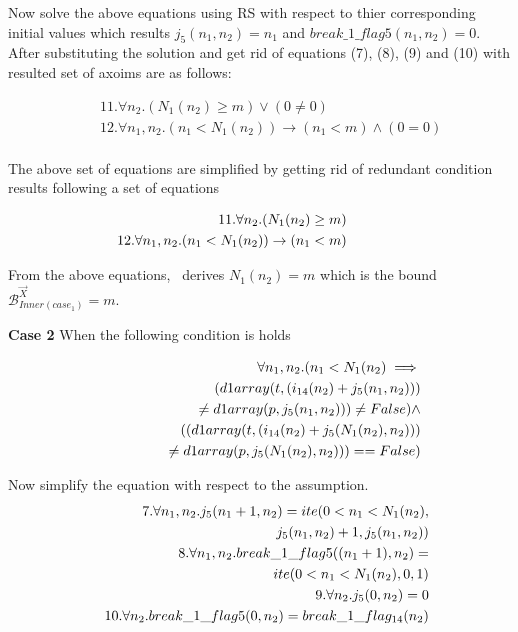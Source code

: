 Now solve the above equations using RS  with respect to thier corresponding initial values which results $j_5(n_1,n_2)=n_1$ and $break\_1\_flag5(n_1,n_2)=0$. After substituting the solution and get rid of equations (7), (8), (9) and (10) with resulted set of axoims are as follows:

\begin{eqnarray*}
	&&11.\forall n_2.(N_1(n_2)\geq m) \lor (0\not=0) \\
	&&12.\forall n_1,n_2.(n_1<N_1(n_2)) \rightarrow (n_1<m) \land (0=0)\\
\end{eqnarray*}

The above set of equations are simplified by getting rid of redundant condition results following a set of equations

\begin{eqnarray*}
	&&\hspace*{-5em}11.\forall n_2.(N_1(n_2)\geq m)  \\
	&&\hspace*{-5em}12.\forall n_1,n_2.(n_1<N_1(n_2)) \rightarrow (n_1<m)\\
\end{eqnarray*}

From the above equations, \SystemName\ derives $N_1(n_2)=m$ which is the bound $\mathcal{B}^{\vec{X}}_{Inner(case_1)}=m$. 

\textbf{Case 2} When the following condition is holds 

\begin{eqnarray*}
	&&\hspace*{-2em}\forall n_1,n_2.(n_1<N_1(n_2) \implies\\ &&\hspace*{1em}(d1array(t,(i_{14}(n_2)+j_5(n_1,n_2)))\\ &&\hspace*{2em}\not=d1array(p,j_{5}(n_1,n_2)))\not= False)\land \\
	&&\hspace*{3em}((d1array(t,(i_{14}(n_2)+j_5(N_1(n_2),n_2)))\\ &&\hspace*{4em}\not=d1array(p,j_{5}(N_1(n_2),n_2)))== False)
\end{eqnarray*}

Now simplify the equation with respect to the assumption.
\begin{eqnarray*}
	&&7.\forall n_1,n_2.j_5(n_1+1,n_2) = ite(0<n_1< N_1(n_2),\\
	&&\hspace*{8em}j_5(n_1,n_2)+1,j_5(n_1,n_2))\\ 
	&&8.\forall n_1,n_2.break\_1\_flag5((n_1+1),n_2) = \\
	&&\hspace*{8em}ite(0<n_1<N_1(n_2),0,1)\\ 
	&&9.\forall n_2.j_{5}(0,n_2) = 0\\
	&&10.\forall n_2.break\_1\_flag5(0,n_2) = break\_1\_flag_{14}(n_2)
\end{eqnarray*}


